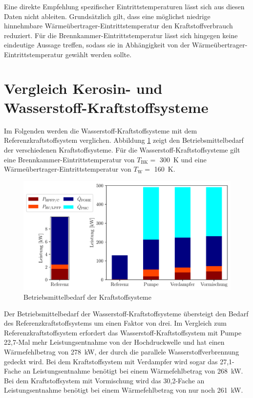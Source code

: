 Eine direkte Empfehlung spezifischer Eintrittstemperaturen lässt sich aus diesen Daten nicht ableiten. Grundsätzlich gilt, dass eine möglichst niedrige hinnehmbare Wärmeübertrager-Eintrittstemperatur den Kraftstoffverbrauch reduziert. Für die Brennkammer-Eintrittstemperatur lässt sich hingegen keine eindeutige Aussage treffen, sodass sie in Abhängigkeit von der Wärmeübertrager-Eintrittstemperatur gewählt werden sollte.

\section{Vergleich Kerosin- und Wasserstoff-Kraftstoffsysteme}

Im Folgenden werden die Wasserstoff-Kraftstoffsysteme mit dem Referenzkraftstoffsystem verglichen. Abbildung \ref{fig:refcomp} zeigt den Betriebsmittelbedarf der verschiedenen Kraftstoffsysteme. Für die Wasserstoff-Kraftstoffsysteme gilt eine Brennkammer-Eintrittstemperatur von $T_\mathrm{BK}=$ \SI{300}{\K} und eine Wärmeübertrager-Eintrittstemperatur von $T_\mathrm{W}=$ \SI{160}{\K}.

\begin{figure}[ht]
\centering
\includegraphics[width=1\linewidth]{4_Abbildungen/2_Hauptteil/Ergebnisse/refcomp.pdf}
  \caption{Betriebsmittelbedarf der Kraftstoffsysteme}
  \label{fig:refcomp}
\end{figure}
\FloatBarrier

Der Betriebsmittelbedarf der Wasserstoff-Kraftstoffsysteme übersteigt den Bedarf des Referenzkraftstoffsystems um einen Faktor von drei. Im Vergleich zum Referenzkraftstoffsystem erfordert das Wasserstoff-Kraftstoffsystem mit Pumpe 22,7-Mal mehr Leistungsentnahme von der Hochdruckwelle und hat einen Wärmefehlbetrag von \SI{278}{\kilo\W}, der durch die parallele Wasserstoffverbrennung gedeckt wird. Bei dem Kraftstoffsystem mit Verdampfer wird sogar das 27,1-Fache an Leistungsentnahme benötigt bei einem Wärmefehlbetrag von \SI{268}{\kilo\W}. Bei dem Kraftstoffsystem mit Vormischung wird das 30,2-Fache an Leistungsentnahme benötigt bei einem Wärmefehlbetrag von nur noch \SI{261}{\kilo\W}. 


